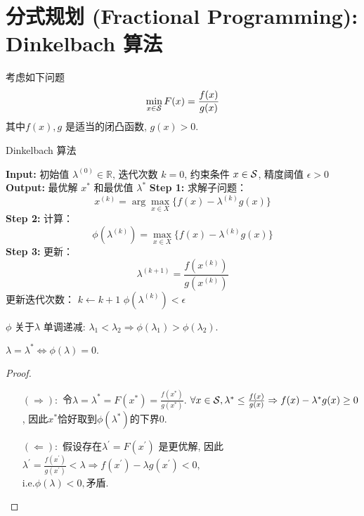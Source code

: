 	\section{分式规划 (Fractional Programming): Dinkelbach 算法}
	考虑如下问题
	\[
	\min_{x\in \S} F(x) = \frac{f(x)}{g(x)}
	\]	
	其中$f(x), g$ 是适当的闭凸函数, $g(x) > 0. $
	\begin{shaded}
		\begin{algorithm}[H]
			\caption{Dinkelbach 算法}
		\begin{algorithmic}[1]
			\State \textbf{Input:} 初始值 \( \lambda^{(0)} \in \mathbb{R} \), 迭代次数 \( k = 0 \), 约束条件 \( x \in \S \), 精度阈值 \( \epsilon > 0 \)
			\State \textbf{Output:} 最优解 \( x^* \) 和最优值 \( \lambda^* \)
			\Repeat
			\State \textbf{Step 1:} 求解子问题：
			\[
			x^{(k)} = \arg \max_{x \in X} \bigl\{ f(x) - \lambda^{(k)} g(x) \bigr\}
			\]
			\State \textbf{Step 2:} 计算：
			\[
			\phi(\lambda^{(k)}) = \max_{x \in X} \bigl\{ f(x) - \lambda^{(k)} g(x) \bigr\}
			\]
			\State \textbf{Step 3:} 更新：
			\[
			\lambda^{(k+1)} = \frac{f(x^{(k)})}{g(x^{(k)})}
			\]
			\State 更新迭代次数： \( k \gets k + 1 \)
			\Until \( \phi(\lambda^{(k)}) < \epsilon \)
		\end{algorithmic}	
		\end{algorithm}
	\end{shaded}
	\begin{property}
	  $\phi$ 关于$\lambda$ 单调递减: \(\lambda_1<\lambda_2\Rightarrow \phi(\lambda_1)>\phi(\lambda_2).\)
	\end{property}
	\begin{property}
		$\lambda = \lambda^*\Leftrightarrow \phi(\lambda)=0.$ 
	\begin{proof}
		\begin{itemize} 
			\item[$(\Rightarrow): $] 令$\lambda=\lambda^*=F(x^*)=\frac{f(x^*)}{g(x^*)}.$
			  $ \forall x \in \S, \lambda^*\leq \frac{f(x)}{g(x)}\Rightarrow f(x)-\lambda^*g(x)\geq 0$, 因此$x^*$恰好取到$\phi(\lambda^*)$的下界$0.$
			  \item[$(\Leftarrow):$] 假设存在$\lambda^\prime=F(x^\prime)$ 是更优解, 因此$\lambda^\prime=\frac{f(x^\prime)}{g(x^\prime)}<\lambda\Rightarrow f(x^\prime)-\lambda g(x^\prime)<0,$ \\$ \mathrm{i.e.} \phi(\lambda)<0, $矛盾.
		\end{itemize}
	\end{proof}
	\end{property}

